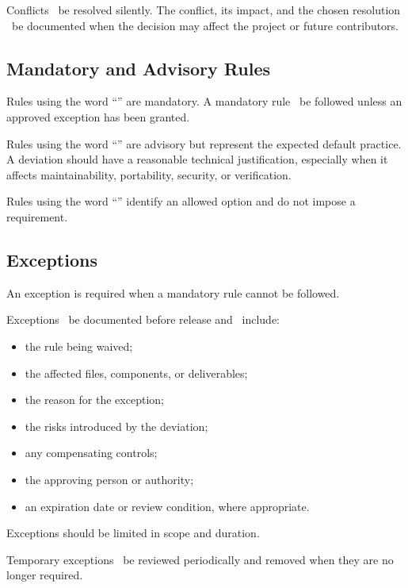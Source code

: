 Conflicts \shouldnot~be resolved silently. The conflict, its impact, and the chosen resolution \should~be documented when the decision may affect the project or future contributors.

\subsection{Mandatory and Advisory Rules}

Rules using the word ``\must'' are mandatory. A mandatory rule \should~be followed unless an approved exception has been granted.

Rules using the word ``\should'' are advisory but represent the expected default practice. A deviation should have a reasonable technical justification, especially when it affects maintainability, portability, security, or verification.

Rules using the word ``\may'' identify an allowed option and do not impose a requirement.

\subsection{Exceptions}

An exception is required when a mandatory rule cannot be followed.

Exceptions \should~be documented before release and \should~include:
\begin{itemize}
    \item the rule being waived;
    \item the affected files, components, or deliverables;
    \item the reason for the exception;
    \item the risks introduced by the deviation;
    \item any compensating controls;
    \item the approving person or authority;
    \item an expiration date or review condition, where appropriate.
\end{itemize}

Exceptions should be limited in scope and duration.

Temporary exceptions \should~be reviewed periodically and removed when they are no longer required.